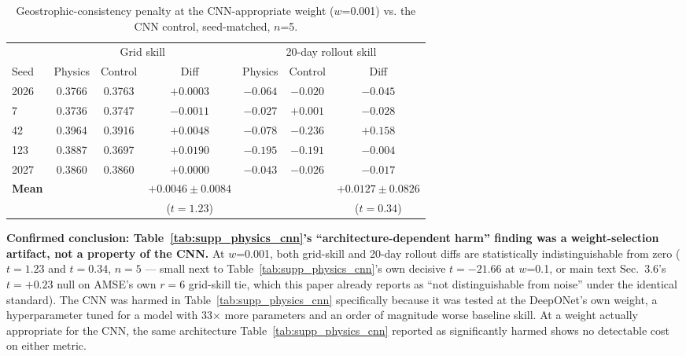 \documentclass[11pt]{article}
\begin{document}
\begin{table}[h]
\centering
\caption{Geostrophic-consistency penalty at the CNN-appropriate weight ($w$=0.001) vs. the CNN control, seed-matched, $n$=5.}
\label{tab:supp_physics_weight_confirm}
\small
\begin{tabular}{lccc|ccc}
\toprule
& \multicolumn{3}{c}{Grid skill} & \multicolumn{3}{c}{20-day rollout skill} \\
\cmidrule(lr){2-4} \cmidrule(lr){5-7}
Seed & Physics & Control & Diff & Physics & Control & Diff \\
\midrule
2026 & 0.3766 & 0.3763 & $+0.0003$ & $-0.064$ & $-0.020$ & $-0.045$ \\
7    & 0.3736 & 0.3747 & $-0.0011$ & $-0.027$ & $+0.001$ & $-0.028$ \\
42   & 0.3964 & 0.3916 & $+0.0048$ & $-0.078$ & $-0.236$ & $+0.158$ \\
123  & 0.3887 & 0.3697 & $+0.0190$ & $-0.195$ & $-0.191$ & $-0.004$ \\
2027 & 0.3860 & 0.3860 & $+0.0000$ & $-0.043$ & $-0.026$ & $-0.017$ \\
\midrule
\textbf{Mean} & & & $\mathbf{+0.0046 \pm 0.0084}$ & & & $\mathbf{+0.0127 \pm 0.0826}$ \\
 & & & ($t=1.23$) & & & ($t=0.34$) \\
\bottomrule
\end{tabular}
\end{table}

\textbf{Confirmed conclusion: Table~\ref{tab:supp_physics_cnn}'s ``architecture-dependent harm'' finding was a weight-selection artifact, not a property of the CNN.} At $w$=0.001, both grid-skill and 20-day rollout diffs are statistically indistinguishable from zero ($t=1.23$ and $t=0.34$, $n=5$ --- small next to Table~\ref{tab:supp_physics_cnn}'s own decisive $t=-21.66$ at $w$=0.1, or main text Sec.~3.6's $t=+0.23$ null on AMSE's own $r=6$ grid-skill tie, which this paper already reports as ``not distinguishable from noise'' under the identical standard). The CNN was harmed in Table~\ref{tab:supp_physics_cnn} specifically because it was tested at the DeepONet's own weight, a hyperparameter tuned for a model with 33$\times$ more parameters and an order of magnitude worse baseline skill. At a weight actually appropriate for the CNN, the same architecture Table~\ref{tab:supp_physics_cnn} reported as significantly harmed shows no detectable cost on either metric.
\end{document}
